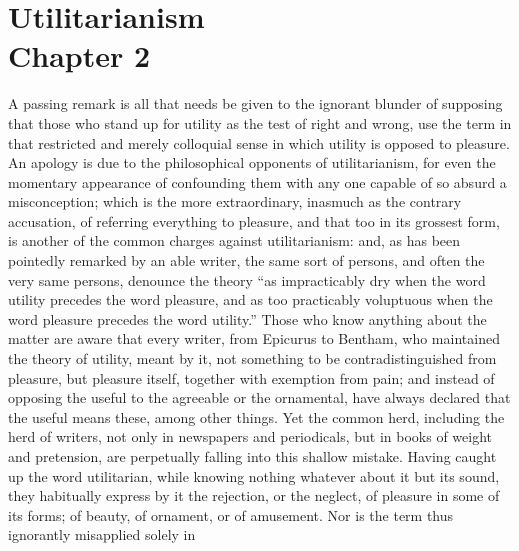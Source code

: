 
\author{John Stuart Mill}
\chapter[John Stuart Mill -- Utilitarianism, chap.
2]{Utilitarianism\\\smaller Chapter 2}



A passing remark is all that needs be given to the ignorant
blunder of supposing that those who stand up for utility as the test
of right and wrong, use the term in that restricted and merely
colloquial sense in which utility is opposed to pleasure. An apology
is due to the philosophical opponents of utilitarianism, for even the
momentary appearance of confounding them with any one capable of so
absurd a misconception; which is the more extraordinary, inasmuch as
the contrary accusation, of referring everything to pleasure, and that
too in its grossest form, is another of the common charges against
utilitarianism: and, as has been pointedly remarked by an able
writer, the same sort of persons, and often the very same persons,
denounce the theory ``as impracticably dry when the word utility
precedes the word pleasure, and as too practicably voluptuous when the
word pleasure precedes the word utility.'' Those who know anything
about the matter are aware that every writer, from Epicurus to
Bentham, who maintained the theory of utility, meant by it, not
something to be contradistinguished from pleasure, but pleasure
itself, together with exemption from pain; and instead of opposing the
useful to the agreeable or the ornamental, have always declared that
the useful  means these, among other things. Yet the common
herd, including the herd of writers, not only in newspapers and
periodicals, but in books of weight and pretension, are perpetually
falling into this shallow mistake. Having caught up the word
utilitarian, while knowing nothing whatever about it but its sound,
they habitually express by it the rejection, or the neglect, of
pleasure in some of its forms; of beauty, of ornament, or of
amusement. Nor is the term thus ignorantly misapplied solely in
